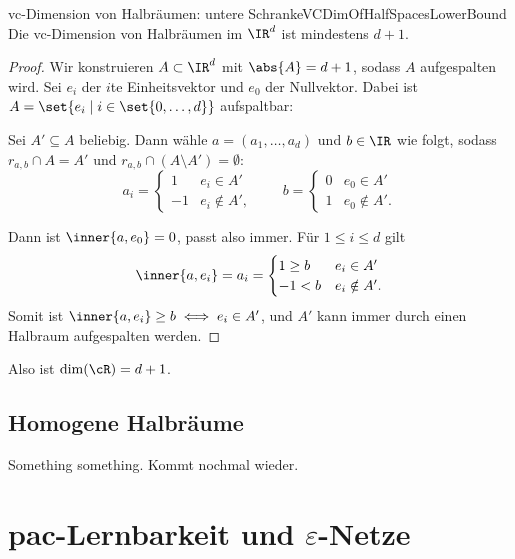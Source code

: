 \documentclass[language=ngerman,algolist,acrolist]{TemplateLecture}
\begin{document}
\begin{thm}{\acs{vc}-Dimension von Halbräumen: untere Schranke}{VCDimOfHalfSpacesLowerBound}
    Die \ac{vc}-Dimension von Halbräumen im $\IR^d$ ist mindestens $d + 1$.
\end{thm}
\begin{proof}
    Wir konstruieren $A \subset \IR^d$ mit $\abs{A} = d + 1$, sodass $A$ aufgespalten wird. Sei $e_i$ der $i$te Einheitsvektor und $e_0$ der Nullvektor. Dabei ist $A = \set{e_i \mid i \in \set{0, \ldots, d}}$ aufspaltbar:

    Sei $A' \subseteq A$ beliebig. Dann wähle $a = (a_1, \ldots, a_d)$ und $b \in \IR$ wie folgt, sodass $r_{a, b} \cap A = A'$ und $r_{a, b} \cap (A \setminus A') = \emptyset$:
    \begin{equation*}
        a_i = \begin{cases}
            1 & e_i \in A' \\
            -1 & e_i \notin A' ,
        \end{cases}
        \quad \quad b = \begin{cases}
            0 & e_0 \in A' \\
            1 & e_0 \notin A'.
        \end{cases}
    \end{equation*}

    Dann ist $\inner{a, e_0} = 0$, passt also immer. Für $1 \leq i \leq d$ gilt
    \begin{equation*}
        \inner{a, e_i} = a_i = \begin{cases}
            1 \geq b & e_i \in A' \\
            -1 < b & e_i \notin A'.
        \end{cases}
    \end{equation*}
    Somit ist $\inner{a, e_i} \geq b \iff e_i \in A'$, und $A'$ kann immer durch einen Halbraum aufgespalten werden.
\end{proof}

Also ist $\dim(\cR) = d + 1$.

\section{Homogene Halbräume}

Something something. Kommt nochmal wieder.



\chapter{\acs{pac}-Lernbarkeit und $\varepsilon$-Netze}
\end{document}
